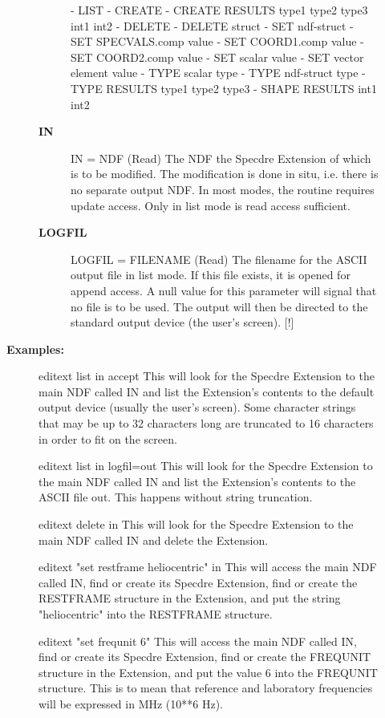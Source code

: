 \begin{description}
\begin{description}
\begin{description}
   -  LIST
   -  CREATE
   -  CREATE RESULTS type1 type2 type3 int1 int2
   -  DELETE
   -  DELETE struct
   -  SET ndf-struct
   -  SET SPECVALS.comp value
   -  SET COORD1.comp value
   -  SET COORD2.comp value
   -  SET scalar value
   -  SET vector element value
   -  TYPE scalar type
   -  TYPE ndf-struct type
   -  TYPE RESULTS type1 type2 type3
   -  SHAPE RESULTS int1 int2
\item [\textbf{IN}]
IN = NDF (Read)
   The NDF the Specdre Extension of which is to be modified. The
   modification is done in situ, i.e. there is no separate output
   NDF. In most modes, the routine requires update access. Only in
   list mode is read access sufficient.
\item [\textbf{LOGFIL}]
LOGFIL = FILENAME (Read)
   The filename for the ASCII output file in list mode. If this
   file exists, it is opened for append access. A null value for
   this parameter will signal that no file is to be used. The
   output will then be directed to the standard output device (the
   user's screen).
   [!]
\end{description}

\item [\textbf{Examples:}]
\begin{terminalv}
editext list in accept
   This will look for the Specdre Extension to the main NDF called IN
   and list the Extension's contents to the default output device
   (usually the user's screen). Some character strings that may be
   up to 32 characters long are truncated to 16 characters in
   order to fit on the screen.

editext list in logfil=out
   This will look for the Specdre Extension to the main NDF called IN
   and list the Extension's contents to the ASCII file out.
   This happens without string truncation.

editext delete in
   This will look for the Specdre Extension to the main NDF called IN
   and delete the Extension.

editext "set restframe heliocentric" in
   This will access the main NDF called IN, find or create its Specdre
   Extension, find or create the RESTFRAME structure in the
   Extension, and put the string "heliocentric" into the RESTFRAME
   structure.

editext "set frequnit 6"
   This will access the main NDF called IN, find or create its Specdre
   Extension, find or create the FREQUNIT structure in the
   Extension, and put the value 6 into the FREQUNIT structure.
   This is to mean that reference and laboratory frequencies will
   be expressed in MHz (10**6 Hz).


\end{terminalv}
\end{description}
\end{description}
